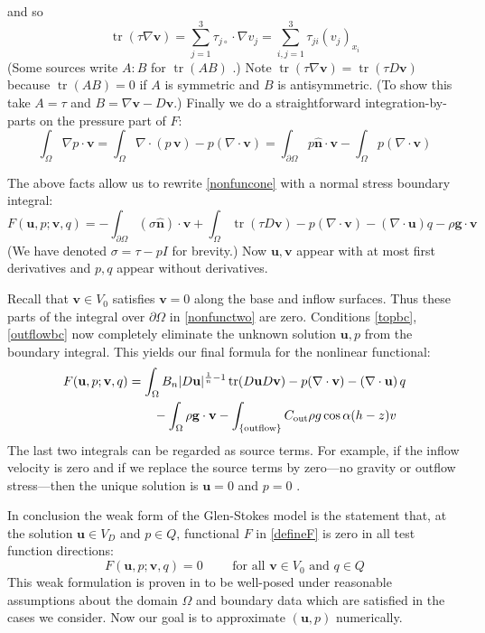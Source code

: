 \documentclass[letterpaper,final,12pt,reqno]{amsart}
\newcommand{\grad}{\nabla}
\newcommand{\trace}{\operatorname{tr}}
\newcommand{\hbn}{\hat{\mathbf{n}}}
\newcommand{\bu}{\mathbf{u}}
\newcommand{\bv}{\mathbf{v}}
\begin{document}
and so
    $$\trace(\tau \grad \bv) = \sum_{j=1}^3 \tau_{j\circ} \cdot \grad v_j = \sum_{i,j=1}^3 \tau_{ji} (v_j)_{x_i}$$
(Some sources write $A:B$ for $\trace(AB)$ \cite{JouvetRappaz2011}.)  Note $\trace(\tau \grad \bv) = \trace(\tau D\bv)$ because $\trace(AB)=0$ if $A$ is symmetric and $B$ is antisymmetric.  (To show this take $A=\tau$ and $B=\grad\bv-D\bv$.)  Finally we do a straightforward integration-by-parts on the pressure part of $F$:
    $$\int_\Omega \nabla p \cdot \bv = \int_\Omega \nabla\cdot (p\,\bv) - p (\nabla \cdot \bv) = \int_{\partial \Omega} p\hbn \cdot \bv - \int_\Omega p (\nabla \cdot \bv)$$

The above facts allow us to rewrite \eqref{nonfuncone} with a normal stress boundary integral:
\begin{equation}
F(\bu,p;\bv,q) = -\int_{\partial\Omega} (\sigma \hbn)\cdot \bv + \int_\Omega \trace(\tau D\bv) - p (\nabla \cdot \bv) - \left(\nabla \cdot \bu\right) q - \rho \mathbf{g} \cdot \bv \label{nonfunctwo}
\end{equation}
(We have denoted $\sigma=\tau-pI$ for brevity.)  Now $\bu,\bv$ appear with at most first derivatives and $p,q$ appear without derivatives.

Recall that $\bv\in V_0$ satisfies $\bv=0$ along the base and inflow surfaces.  Thus these parts of the integral over $\partial\Omega$ in \eqref{nonfunctwo} are zero.  Conditions \eqref{topbc}, \eqref{outflowbc} now completely eliminate the unknown solution $\bu,p$ from the boundary integral.  This yields our final formula for the nonlinear functional:
\begin{align}
F(\bu,p;\bv,q) &= \int_\Omega B_n |D\bu|^{\frac{1}{n} - 1} \trace(D\bu D\bv) - p (\nabla \cdot \bv) - \left(\nabla \cdot \bu\right) q \label{defineF} \\
    &\qquad  - \int_\Omega \rho \mathbf{g} \cdot \bv - \int_{\{\text{outflow}\}} C_{\text{out}} \rho g \cos\alpha (h-z) v  \notag
\end{align}
The last two integrals can be regarded as source terms.  For example, if the inflow velocity is zero and if we replace the source terms by zero---no gravity or outflow stress---then the unique solution is $\bu=0$ and $p=0$ \cite{Elmanetal2014}.

In conclusion the weak form of the Glen-Stokes model is the statement that, at the solution $\bu\in V_D$ and $p\in Q$, functional $F$ in \eqref{defineF} is zero in all test function directions:
\begin{equation}
F(\bu,p;\bv,q) = 0 \qquad \text{ for all } \bv\in V_0 \text{ and } q\in Q  \label{weak}
\end{equation}
This weak formulation is proven in \cite[Theorem 3.8]{JouvetRappaz2011} to be well-posed under reasonable assumptions about the domain $\Omega$ and boundary data which are satisfied in the cases we consider.  Now our goal is to approximate $(\bu,p)$ numerically.
\end{document}
